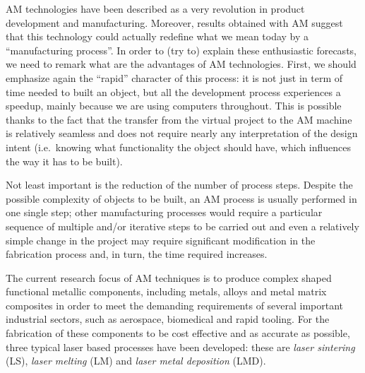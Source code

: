 
AM technologies have been described as a very revolution in product development and manufacturing. Moreover, results obtained with AM suggest that this technology could actually redefine what we mean today by a ``manufacturing process''. In order to (try to) explain these enthusiastic forecasts, we need to remark what are the advantages of AM technologies. First, we should emphasize again the ``rapid'' character of this process: it is not just in term of time needed to built an object, but all the development process experiences a speedup, mainly because we are using computers throughout. This is possible thanks to the fact that the transfer from the virtual project to the AM machine is relatively seamless and does not require nearly any interpretation of the design intent (i.e.\ knowing what functionality the object should have, which influences the way it has to be built).

Not least important is the reduction of the number of process steps. Despite the possible complexity of objects to be built, an AM process is usually performed in one single step; other manufacturing processes would require a particular sequence of multiple and/or iterative steps to be carried out and even a relatively simple change in the project may require significant modification in the fabrication process and, in turn, the time required increases.

The current research focus of AM techniques is to produce complex shaped functional metallic components, including metals, alloys and metal matrix composites in order to meet the demanding requirements of several important industrial sectors, such as aerospace, biomedical and rapid tooling. For the fabrication of these components to be cost effective and as accurate as possible, three typical laser based processes have been developed: these are \emph{laser sintering} (LS), \emph{laser melting} (LM) and \emph{laser metal deposition} (LMD).




